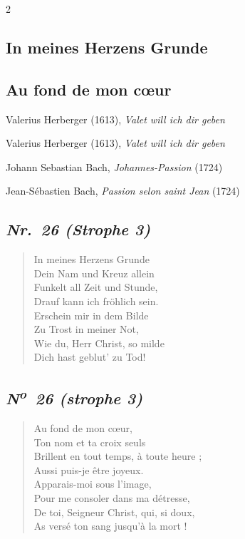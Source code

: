 \documentclass[a4paper,12pt]{article}
\newcommand\chunks[2]{%
\begin{leftcolumn*}\begin{otherlanguage}{german}%
{#1}%
\end{otherlanguage}\end{leftcolumn*}%
\begin{rightcolumn}\begin{otherlanguage}{french}%
{#2}%
\end{otherlanguage}\end{rightcolumn}%
}
\newcommand\strophe[1]{\subsection*{\normalsize\normalfont\itshape #1}}
\begin{document}
\thispagestyle{empty}
\setlength{\columnsep}{8mm}


\begin{paracol}{2}
  \chunks{\section*{In meines Herzens Grunde}}
         {\section*{Au fond de mon cœur}}

  \chunks{\noindent\raggedright\small Valerius Herberger (1613), \textit{Valet will ich dir geben}}
         {\noindent\raggedright\small Valerius Herberger (1613), \textit{Valet will ich dir geben}}

  \chunks{\noindent\raggedright\small Johann Sebastian Bach, \textit{Johannes-Passion} (1724)}
         {\noindent\raggedright\small Jean-Sébastien Bach, \textit{Passion selon saint Jean} (1724)}

  \chunks{\strophe{Nr.~26 (Strophe 3)}
          \begin{verse}
          In meines Herzens Grunde\\
          Dein Nam und Kreuz allein\\
          Funkelt all Zeit und Stunde,\\
          Drauf kann ich fröhlich sein.\\
          Erschein mir in dem Bilde\\
          Zu Trost in meiner Not,\\
          Wie du, Herr Christ, so milde\\
          Dich hast geblut’ zu Tod!
          \end{verse}}
         {\strophe{N\textsuperscript{o}~26 (strophe 3)}
          \begin{verse}
          Au fond de mon cœur,\\
          Ton nom et ta croix seuls\\
          Brillent en tout temps, à toute heure ;\\
          Aussi puis-je être joyeux.\\
          Apparais-moi sous l’image,\\
          Pour me consoler dans ma détresse,\\
          De toi, Seigneur Christ, qui, si doux,\\
          As versé ton sang jusqu’à la mort !
          \end{verse}}
\end{paracol}
\end{document}
